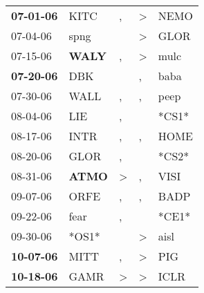 \begin{supertabular}{p{0.07\textwidth}p{0.06\textwidth}p{0.02\textwidth}p{0.02\textwidth}p{0.06\textwidth}}
 \textbf{07-01-06\textsuperscript{}} &           KITC\textsuperscript{} &                , &     \textgreater &           NEMO\textsuperscript{} \\
          07-04-06\textsuperscript{} &           spng\textsuperscript{} &                  &     \textgreater &           GLOR\textsuperscript{} \\
          07-15-06\textsuperscript{} &  \textbf{WALY\textsuperscript{}} &                , &     \textgreater &           mulc\textsuperscript{} \\
 \textbf{07-20-06\textsuperscript{}} &            DBK\textsuperscript{} &                  &                , &           baba\textsuperscript{} \\
          07-30-06\textsuperscript{} &           WALL\textsuperscript{} &                , &                , &           peep\textsuperscript{} \\
          08-04-06\textsuperscript{} &            LIE\textsuperscript{} &                , &                  &                            *CS1* \\
          08-17-06\textsuperscript{} &           INTR\textsuperscript{} &                , &                , &           HOME\textsuperscript{} \\
          08-20-06\textsuperscript{} &           GLOR\textsuperscript{} &                , &                  &                            *CS2* \\
          08-31-06\textsuperscript{} &  \textbf{ATMO\textsuperscript{}} &     \textgreater &                , &           VISI\textsuperscript{} \\
          09-07-06\textsuperscript{} &           ORFE\textsuperscript{} &                , &                , &           BADP\textsuperscript{} \\
          09-22-06\textsuperscript{} &           fear\textsuperscript{} &                , &                  &                            *CE1* \\
          09-30-06\textsuperscript{} &                            *OS1* &                  &     \textgreater &           aisl\textsuperscript{} \\
 \textbf{10-07-06\textsuperscript{}} &           MITT\textsuperscript{} &                , &     \textgreater &            PIG\textsuperscript{} \\
 \textbf{10-18-06\textsuperscript{}} &           GAMR\textsuperscript{} &     \textgreater &     \textgreater &           ICLR\textsuperscript{} \\

\end{supertabular}
